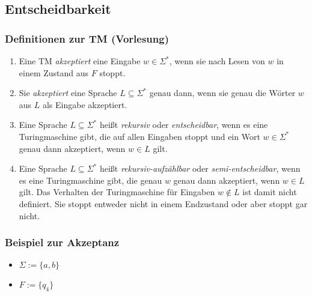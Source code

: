 \documentclass{beamer}
\begin{document}
{\subsection{Entscheidbarkeit}
\begin{frame}
 \frametitle{Definitionen zur TM (Vorlesung)}
 \begin{enumerate}
  \item Eine TM \emph{akzeptiert} eine Eingabe $w \in \Sigma^*$, wenn sie nach Lesen von $w$ in einem Zustand aus $F$ stoppt.
  \item Sie \emph{akzeptiert} eine Sprache $L \subseteq \Sigma^*$ genau dann, wenn sie genau die Wörter $w$ aus $L$ als Eingabe akzeptiert.
  \item Eine Sprache $L \subseteq \Sigma^*$ heißt \emph{rekursiv} oder \emph{entscheidbar}, wenn es eine Turingmaschine gibt, die auf allen Eingaben stoppt und
	ein Wort $w \in \Sigma^*$ genau dann akzeptiert, wenn $w \in L$ gilt.
  \item Eine Sprache $L \subseteq \Sigma^*$ heißt \emph{rekursiv-aufzählbar} oder \emph{semi-entscheidbar}, wenn es eine Turingmaschine gibt, 
	die genau $w$ genau dann akzeptiert, wenn $w \in L$ gilt. Das Verhalten der Turingmaschine für Eingaben $w \not\in L$ ist damit nicht definiert.
	Sie stoppt entweder nicht in einem Endzustand oder aber stoppt gar nicht.
 \end{enumerate}
\end{frame}

\begin{frame}
 \frametitle{Beispiel zur Akzeptanz}
 \begin{itemize}
  \item $\Sigma := \{a, b\}$  
  \item $F := \{q_4\}$
 \end{itemize}
\vspace{-2cm}
 \end{frame}

}
\end{document}
